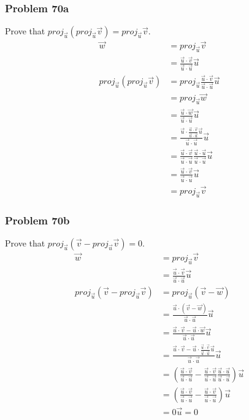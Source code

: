 \documentclass[letterpaper, 12pt]{math}
\begin{document}
\subsubsection*{Problem 70a}
Prove that \( proj_{\vec{u}}(proj_{\vec{u}}\vec{v}) = proj_{\vec{u}}\vec{v} \).
\begin{align*}
  \vec{w} &= proj_{\vec{u}}\vec{v} \\
  &= \frac{\vec{u}\cdot\vec{v}}{\vec{u}\cdot\vec{u}}\vec{u} \\
  proj_{\vec{u}}(proj_{\vec{u}}\vec{v}) &= proj_{\vec{u}}
    \frac{\vec{u}\cdot\vec{v}}{\vec{u}\cdot\vec{u}}\vec{u} \\
  &= proj_{\vec{u}}\vec{w} \\
  &= \frac{\vec{u}\cdot\vec{w}}{\vec{u}\cdot\vec{u}}\vec{u} \\
  &= \frac{\vec{u}\cdot\frac{\vec{u}\cdot\vec{v}}{\vec{u}\cdot\vec{u}}\vec{u}}
    {\vec{u}\cdot\vec{u}}\vec{u} \\
  &= \frac{\vec{u}\cdot\vec{v}}{\vec{u}\cdot\vec{u}}
    \frac{\vec{u}\cdot\vec{u}}{\vec{u}\cdot\vec{u}}\vec{u} \\
  &= \frac{\vec{u}\cdot\vec{v}}{\vec{u}\cdot\vec{u}}\vec{u} \\
  &= proj_{\vec{u}}\vec{v}
\end{align*}

\subsubsection*{Problem 70b}
Prove that \( proj_{\vec{u}}(\vec{v}-proj_{\vec{u}}\vec{v}) = 0 \).
\begin{align*}
  \vec{w} &= proj_{\vec{u}}\vec{v} \\
  &= \frac{\vec{u}\cdot\vec{v}}{\vec{u}\cdot\vec{u}}\vec{u} \\
  proj_{\vec{u}}(\vec{v}-proj_{\vec{u}}\vec{v}) &=
    proj_{\vec{u}}(\vec{v}-\vec{w}) \\
  &= \frac{\vec{u}\cdot(\vec{v}-\vec{w})}{\vec{u}\cdot\vec{u}}\vec{u} \\
  &= \frac{\vec{u}\cdot\vec{v}-\vec{u}\cdot\vec{w}}
    {\vec{u}\cdot\vec{u}}\vec{u} \\
  &= \frac{\vec{u}\cdot\vec{v}-\vec{u}\cdot
    \frac{\vec{u}\cdot\vec{v}}{\vec{u}\cdot\vec{u}}\vec{u}}
    {\vec{u}\cdot\vec{u}}\vec{u} \\
  &= \left(\frac{\vec{u}\cdot\vec{v}}{\vec{u}\cdot\vec{u}}-
    \frac{\vec{u}\cdot\vec{v}}{\vec{u}\cdot\vec{u}}
    \frac{\vec{u}\cdot\vec{u}}{\vec{u}\cdot\vec{u}}\right)\vec{u} \\
  &= \left(\frac{\vec{u}\cdot\vec{v}}{\vec{u}\cdot\vec{u}}-
    \frac{\vec{u}\cdot\vec{v}}{\vec{u}\cdot\vec{u}}\right)\vec{u} \\
  &= 0\vec{u} = 0
\end{align*}
\end{document}
